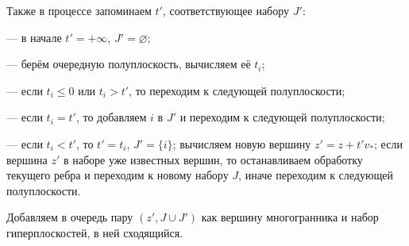 \documentclass[a4paper,12pt]{article}
\renewcommand{\.}{\hspace{0.2ex}}
\begin{document}
  Также в процессе запоминаем $t'$, соответствующее набору $J'$:

  --- в начале $t' = +\infty$, $J' = \varnothing$;

  --- берём очередную полуплоскость, вычисляем её $t_i$;

  --- если $t_i \leqslant 0$ или $t_i > t'$, то переходим к следующей полуплоскости;

  --- если $t_i = t'$, то добавляем $i$ в $J'$ и переходим к следующей полуплоскости;

  --- если $t_i < t'$, то $t' = t_i$, $J' = \{i\}$; вычисляем новую вершину $z' = z + t' v_*$; если вершина $z'$ в наборе уже известных вершин, то останавливаем обработку текущего ребра и переходим к новому набору $J$, иначе переходим к следующей полуплоскости.



  Добавляем в очередь пару $(z', J \cup J')$ как вершину многогранника и набор гиперплоскостей, в ней сходящийся.
\end{document}

